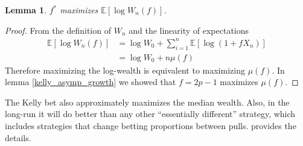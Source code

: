 \documentclass[letterpaper]{article}
\numberwithin{equation}{section}
\theoremstyle{plain}
\newtheorem{lemma}{Lemma}[section]
\begin{document}
\begin{lemma}
$f^*$ maximizes $\mathbb{E}[\log W_n(f)]$.
\end{lemma}
\begin{proof}
From the definition of $W_n$ and the linearity of expectations
\begin{align}
\mathbb{E}[\log W_n(f)] &= \log W_0 + \sum_{i=1}^n \mathbb{E}[\log (1+f X_n)]\\
&= \log W_0 + n \mu(f)
\end{align}
Therefore maximizing the log-wealth is equivalent to maximizing $\mu(f)$. In lemma \ref{kelly_asymp_growth} we showed that $f = 2p-1$ maximizes $\mu(f)$.
\end{proof}

The Kelly bet also approximately maximizes the median wealth. Also, in the long-run it will do better than any other ``essentially different'' strategy, which includes strategies that change betting proportions between pulls. \cite{ethier2010doctrine} provides the details.
\end{document}
